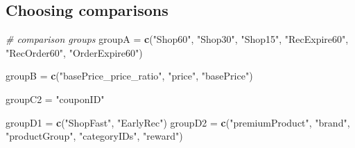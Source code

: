 \documentclass[10pt]{report}
\newenvironment{Shaded}{}{}
\newcommand{\KeywordTok}[1]{\textcolor[rgb]{0.00,0.44,0.13}{\textbf{{#1}}}}
\newcommand{\DataTypeTok}[1]{\textcolor[rgb]{0.56,0.13,0.00}{{#1}}}
\newcommand{\StringTok}[1]{\textcolor[rgb]{0.25,0.44,0.63}{{#1}}}
\newcommand{\CommentTok}[1]{\textcolor[rgb]{0.38,0.63,0.69}{\textit{{#1}}}}
\newcommand{\NormalTok}[1]{{#1}}
\begin{document}
\begin{Shaded}
\end{Shaded}

\subsection{Choosing comparisons}\label{choosing-comparisons}

\begin{Shaded}
\begin{Highlighting}[]
\CommentTok{# comparison groups}
\NormalTok{groupA =}\StringTok{ }\KeywordTok{c}\NormalTok{(}\StringTok{"Shop60"}\NormalTok{, }\StringTok{"Shop30"}\NormalTok{, }\StringTok{"Shop15"}\NormalTok{, }\StringTok{"RecExpire60"}\NormalTok{, }\StringTok{"RecOrder60"}\NormalTok{, }\StringTok{"OrderExpire60"}\NormalTok{)}

\NormalTok{groupB =}\StringTok{ }\KeywordTok{c}\NormalTok{(}\StringTok{"basePrice_price_ratio"}\NormalTok{, }\StringTok{"price"}\NormalTok{, }\StringTok{"basePrice"}\NormalTok{)}

\NormalTok{groupC2 =}\StringTok{ "couponID"}

\NormalTok{groupD1 =}\StringTok{ }\KeywordTok{c}\NormalTok{(}\StringTok{"ShopFast"}\NormalTok{, }\StringTok{"EarlyRec"}\NormalTok{)}
\NormalTok{groupD2 =}\StringTok{ }\KeywordTok{c}\NormalTok{(}\StringTok{"premiumProduct"}\NormalTok{, }\StringTok{"brand"}\NormalTok{, }\StringTok{"productGroup"}\NormalTok{, }\StringTok{"categoryIDs"}\NormalTok{, }\StringTok{"reward"}\NormalTok{)}
\end{Highlighting}
\end{Shaded}
\end{document}
